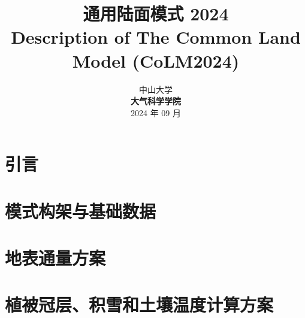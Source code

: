 \documentclass[a4paper,12pt,twoside]{report}
\begin{document}
%

\title{\huge {\bf 通用陆面模式 2024}\\[3em]
  \fontsize {22}{24}
  \bf{ Description of The Common Land Model (CoLM2024)}\\[3in]
  \fontsize {20}{23}%
}

\author{%
  \large{ 中山大学 }\\[0.1in]
  {\bf 大气科学学院}\\[1in]
  \upshape
  \large%
  2024 年 09 月%
}

\maketitle
\preface
%
%
%
%


\body



\part{引言}


\part{模式构架与基础数据}



\part{地表通量方案}\label{part:flux}






\part{植被冠层、积雪和土壤温度计算方案}\label{part:temp}


\end{document}
